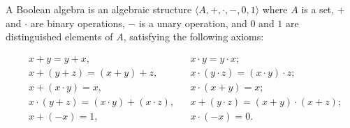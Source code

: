 A Boolean algebra is an algebraic structure $\langle A, +, \cdot, -, 0, 1 \rangle$ where $A$ is a set, $+$ and $\cdot$ are binary operations, $-$ is a unary operation, and $0$ and $1$ are distinguished elements of $A$, satisfying the following axioms:

\begin{align}
&x + y = y + x, && x \cdot y = y \cdot x;\\
&x + (y + z) = (x + y) + z, && x \cdot (y \cdot z) = (x \cdot y) \cdot z;\\
&x + (x \cdot y) = x, && x \cdot (x + y) = x;\\
&x \cdot (y + z) = (x \cdot y) + (x \cdot z), && x + (y \cdot z) = (x + y) \cdot (x + z);\\
&x + (-x) = 1, && x \cdot (-x) = 0.
\end{align}
